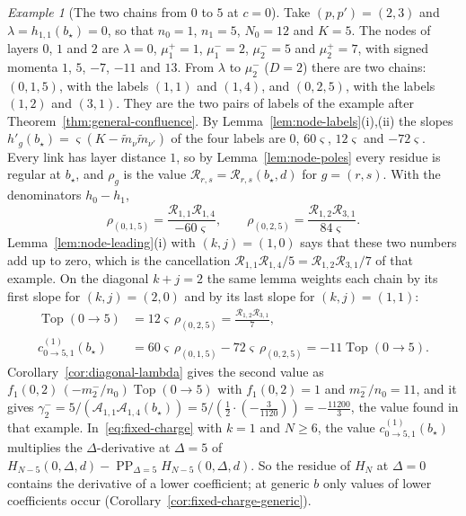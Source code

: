 \documentclass[twoside,10pt]{article}
\numberwithin{equation}{section}
\theoremstyle{slbody}
\theoremstyle{definition}
\theoremstyle{remark}
\newtheorem*{example*}{Example}
\newcommand{\PP}{\operatorname{PP}}
\begin{document}
\begin{example*}[The two chains from $0$ to $5$ at $c=0$]
Take $(p,p')=(2,3)$ and $\lambda=h_{1,1}(b_\star)=0$, so that $n_0=1$,
$n_1=5$, $N_0=12$ and $K=5$.  The nodes of layers $0$, $1$ and $2$ are
$\lambda=0$, $\mu^+_1=1$, $\mu^-_1=2$, $\mu^-_2=5$ and $\mu^+_2=7$, with signed
momenta $1$, $5$, $-7$, $-11$ and $13$.  From $\lambda$ to $\mu^-_2$ ($D=2$)
there are two chains: $(0,1,5)$, with the labels $(1,1)$ and $(1,4)$, and
$(0,2,5)$, with the labels $(1,2)$ and $(3,1)$.  They are the two pairs of
labels of the example after Theorem~\ref{thm:general-confluence}.  By
Lemma~\ref{lem:node-labels}(i),(ii) the slopes
$h'_g(b_\star)=\varsigma(K-\tilde m_\nu\tilde m_{\nu'})$ of the four labels are
$0$, $60\varsigma$, $12\varsigma$ and $-72\varsigma$.  Every link has layer
distance $1$, so by Lemma~\ref{lem:node-poles} every residue is regular at
$b_\star$, and $\rho_g$ is the value ${\mathcal R}_{r,s}={\mathcal R}_{r,s}(b_\star,d)$
for $g=(r,s)$.  With the denominators $h_0-h_1$,
\[
 \rho_{(0,1,5)}=\frac{{\mathcal R}_{1,1}{\mathcal R}_{1,4}}{-60\varsigma},\qquad
 \rho_{(0,2,5)}=\frac{{\mathcal R}_{1,2}{\mathcal R}_{3,1}}{84\varsigma}.
\]
Lemma~\ref{lem:node-leading}(i) with $(k,j)=(1,0)$ says that these two numbers
add up to zero, which is the cancellation
${\mathcal R}_{1,1}{\mathcal R}_{1,4}/5={\mathcal R}_{1,2}{\mathcal R}_{3,1}/7$
of that example.  On the diagonal $k+j=2$ the same lemma weights each chain by
its first slope for $(k,j)=(2,0)$ and by its last slope for $(k,j)=(1,1)$:
\begin{align*}
 \operatorname{Top}(0\to5)&=12\varsigma\,\rho_{(0,2,5)}
 =\frac{{\mathcal R}_{1,2}{\mathcal R}_{3,1}}7,\\
 c^{(1)}_{0\to5,1}(b_\star)&=60\varsigma\,\rho_{(0,1,5)}-72\varsigma\,\rho_{(0,2,5)}
 =-11\operatorname{Top}(0\to5).
\end{align*}
Corollary~\ref{cor:diagonal-lambda} gives the second value as
$f_1(0,2)\,(-m^-_2/n_0)\operatorname{Top}(0\to5)$ with $f_1(0,2)=1$ and
$m^-_2/n_0=11$, and it gives
$\gamma^-_2=5/({\mathcal A}_{1,1}{\mathcal A}_{1,4}(b_\star))
=5/(\frac12\cdot(-\frac3{1120}))=-\frac{11200}3$, the value found in that
example.  In~\eqref{eq:fixed-charge} with $k=1$ and $N\geq6$, the value
$c^{(1)}_{0\to5,1}(b_\star)$ multiplies the $\Delta$-derivative at $\Delta=5$
of $H_{N-5}(0,\Delta,d)-\PP_{\Delta=5}H_{N-5}(0,\Delta,d)$.  So the residue
of $H_N$ at $\Delta=0$ contains the derivative of a lower coefficient; at
generic $b$ only values of lower coefficients occur
(Corollary~\ref{cor:fixed-charge-generic}).
\end{example*}
\end{document}
